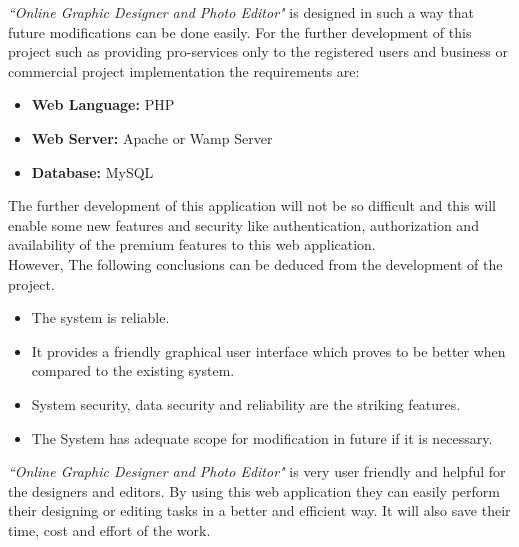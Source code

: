\documentclass[12pt,a4 paper]{report}
\begin{document}
\textit{``Online Graphic Designer and Photo Editor"} is designed in such a way that future modifications can be done easily. For the further development of this project such as providing pro-services only to the registered users and business or commercial project implementation the requirements are: 

\begin{itemize}
\item \textbf{Web Language:} PHP 
\item  \textbf{Web Server:} Apache or Wamp Server 
\item  \textbf{Database:} MySQL
\end{itemize}

The further development of this application will not be so difficult and this will enable some new features and security like authentication, authorization and availability of the premium features to this web application. \\

However, The following conclusions can be deduced from the development of the project.

\begin{itemize}
\item The system is reliable.
\item It provides a friendly graphical user interface which proves to be better when compared to the existing system.   
\item System security, data security and reliability are the striking features. 
\item The System has adequate scope for modification in future if it is necessary. 
\end{itemize}

\noindent \textit{``Online Graphic Designer and Photo Editor"} is very user friendly and helpful for the designers and editors. By using this web application they can easily perform their designing or editing tasks in a better and efficient way. It will also save their time, cost and effort of the work.
\end{document}
